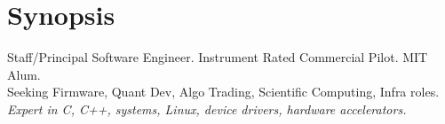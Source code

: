 \section{Synopsis}
Staff/Principal Software Engineer. Instrument Rated Commercial Pilot. MIT Alum.\\
Seeking Firmware, Quant Dev, Algo Trading, Scientific Computing, Infra roles. \\
\emph{Expert in C, C++, systems, Linux, device drivers, hardware accelerators.}
